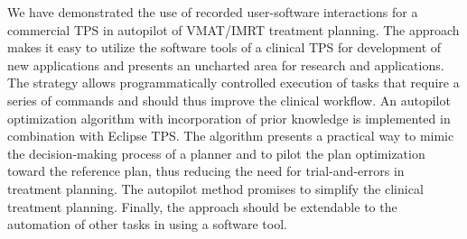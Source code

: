 We have demonstrated the use of recorded user-software interactions for a commercial TPS in autopilot of VMAT/IMRT treatment planning. The approach makes it easy to utilize the software tools of a clinical TPS for development of new applications and presents an uncharted area for research and applications. The strategy allows programmatically controlled execution of tasks that require a series of commands and should thus improve the clinical workflow. An autopilot optimization algorithm with incorporation of prior knowledge is implemented in combination with Eclipse TPS.  The algorithm presents a practical way to mimic the decision-making process of a planner and to pilot the plan optimization toward the reference plan, thus reducing the need for trial-and-errors in treatment planning. The autopilot method promises to simplify the clinical treatment planning. Finally, the approach should be extendable to the automation of other tasks in using a software tool. 